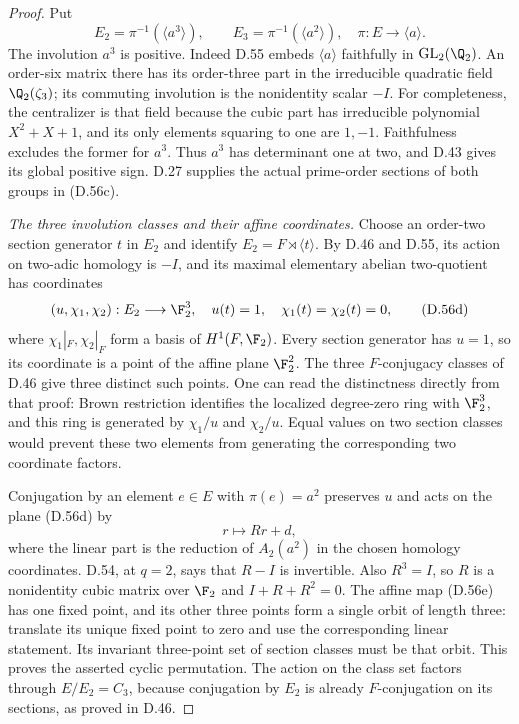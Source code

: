\begin{proof}
Put
\[
 E_2=\pi^{-1}(\langle a^3\rangle),\qquad
 E_3=\pi^{-1}(\langle a^2\rangle),
 \quad \pi:E\longrightarrow\langle a\rangle .          \tag{D.56c}
\]
The involution $a^3$ is positive.
Indeed D.55 embeds $\langle a\rangle$ faithfully
in $\operatorname{GL}_2(\Q_2)$.
An order-six matrix there has its order-three
part in the irreducible quadratic field
$\Q_2(\zeta_3)$; its commuting involution is
the nonidentity scalar $-I$.
For completeness, the centralizer is that field
because the cubic part has irreducible polynomial
$X^2+X+1$, and its only elements squaring to one
are $1,-1$. Faithfulness excludes the former
for $a^3$.
Thus $a^3$ has determinant one at two, and D.43
gives its global positive sign.
D.27 supplies the actual prime-order sections
of both groups in (D.56c).

\emph{The three involution classes and their affine coordinates.}
Choose an order-two section generator $t$ in
$E_2$ and identify $E_2=F\rtimes\langle t\rangle$.
By D.46 and D.55, its action on two-adic
homology is $-I$, and its maximal elementary
abelian two-quotient has coordinates
\[
 (u,\chi_1,\chi_2):E_2\longrightarrow\F_2^3,
 \quad u(t)=1,\quad\chi_1(t)=\chi_2(t)=0,                \tag{D.56d}
\]
where $\chi_1|_F,\chi_2|_F$ form a basis of
$H^1(F,\F_2)$.
Every section generator has $u=1$, so its
coordinate is a point of the affine plane
$\F_2^2$.
The three $F$-conjugacy classes of D.46 give
three distinct such points.
One can read the distinctness directly from
that proof: Brown restriction identifies the
localized degree-zero ring with $\F_2^3$,
and this ring is generated by $\chi_1/u$ and
$\chi_2/u$. Equal values on two section
classes would prevent these two elements
from generating the corresponding two
coordinate factors.

Conjugation by an element $e\in E$ with
$\pi(e)=a^2$ preserves $u$ and acts on the
plane (D.56d) by
\[
                           r\longmapsto Rr+d,           \tag{D.56e}
\]
where the linear part is the reduction of
$A_2(a^2)$ in the chosen homology coordinates.
D.54, at $q=2$, says that $R-I$ is invertible.
Also $R^3=I$, so $R$ is a nonidentity cubic
matrix over $\F_2$ and $I+R+R^2=0$.
The affine map (D.56e) has one fixed point,
and its other three points form a single
orbit of length three: translate its unique
fixed point to zero and use the corresponding
linear statement.
Its invariant three-point set of section
classes must be that orbit.
This proves the asserted cyclic permutation.
The action on the class set factors through
$E/E_2=C_3$, because conjugation by $E_2$
is already $F$-conjugation on its sections,
as proved in D.46.


\end{proof}
